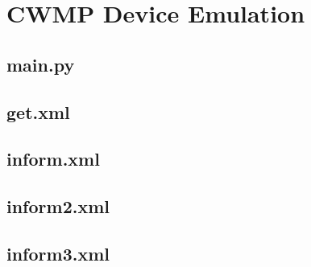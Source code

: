 \section{CWMP Device Emulation}
\label{appendix:cwmp_dev_emu}

\subsection{main.py}


\subsection{get.xml}


\subsection{inform.xml}


\subsection{inform2.xml}


\subsection{inform3.xml}

